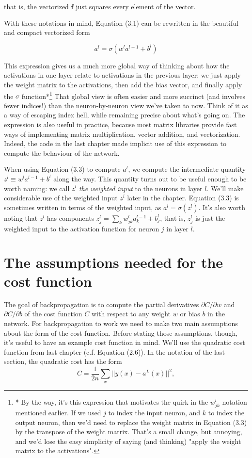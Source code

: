 \documentclass[a4paper,12pt]{report}%
\begin{document}
that is, the vectorized $\mathbf{f}$ just squares every element of the vector.

With these notations in mind, Equation (3.1) can be rewritten in the beautiful and compact vectorized form

\begin{equation}
 a^{l} = \sigma (w^{l} a^{l-1} + b^{l})
\end{equation}

This expression gives us a much more global way of thinking about how the activations in one layer relate to activations in the previous layer: we just apply the weight matrix to the activations, then add the bias vector, and finally apply the $\sigma$ function*\footnote{\color{blue}* By the way, it's this expression that motivates the quirk in the $w^{l}_{jk}$ notation mentioned earlier. If we used $j$ to index the input neuron, and $k$ to index the output neuron, then we'd need to replace the weight matrix in Equation (3.3) by the transpose of the weight matrix. That's a small change, but annoying, and we'd lose the easy simplicity of saying (and thinking) "apply the weight matrix to the activations".} That global view is often easier and more succinct (and involves fewer indices!) than the neuron-by-neuron view we've taken to now. Think of it as a way of escaping index hell, while remaining precise about what's going on. The expression is also useful in practice, because most matrix libraries provide fast ways of implementing matrix multiplication, vector addition, and vectorization. Indeed, the code in the last chapter made implicit use of this expression to compute the behaviour of the network.

When using Equation (3.3) to compute $a^{l}$, we compute the intermediate quantity $z^{l} \equiv w^{l} a^{l−1} + b^{l}$ along the way. This quantity turns out to be useful enough to be worth naming: we call $z^{l}$ {\it the weighted input} to the neurons in layer $l$. We'll make considerable use of the weighted input $z^{l}$ later in the chapter. Equation (3.3) is sometimes written in terms of the weighted input, as $a^{l} = \sigma(z^{l})$. It's also worth noting that $z^{l}$ has components $z^{l}_{j} = \sum_{k} w^{l}_{jk} a^{l−1}_{k} + b^{l}_{j}$, that is, $z^{l}_{j}$ is just the weighted input to the activation function for neuron $j$ in layer $l$.


\section{The assumptions needed for the cost function}
The goal of backpropagation is to compute the partial derivatives $∂C/∂w$ and $∂C/∂b$ of the cost function $C$ with respect to any weight $w$ or bias $b$ in the network. For backpropagation to work we need to make two main assumptions about the form of the cost function. Before stating those assumptions, though, it's useful to have an example cost function in mind. We'll use the quadratic cost function from last chapter (c.f. Equation (2.6)). In the notation of the last section, the quadratic cost has the form
\begin{equation}
  C = \frac{1}{2n} \sum_{x} || y(x)−a^{L}(x) ||^{2},
\end{equation}
\end{document}
